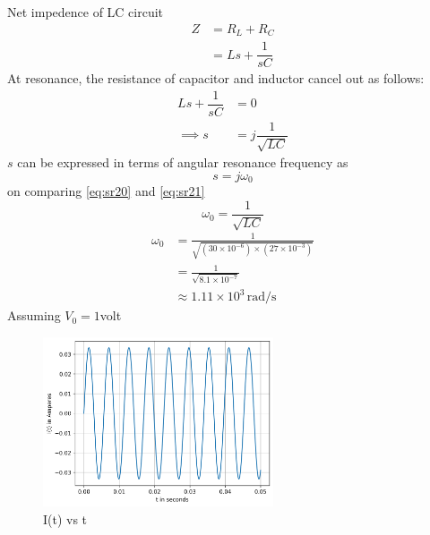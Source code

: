 \documentclass[journal,12pt,twocolumn]{IEEEtran}
\theoremstyle{remark}
\begin{document}
Net impedence of LC circuit \\
\begin{align}
Z&=R_L +R_C \\
&=Ls + \dfrac{1}{sC} 
\end{align}
At resonance, the resistance of capacitor and inductor cancel out as follows:
\begin{align}
    Ls + \dfrac{1}{sC} &= 0\\
    \implies s &= j\dfrac{1}{\sqrt{LC}} \label{eq:sr20}
\end{align}
$s$ can be expressed in terms of angular resonance frequency as
\begin{equation}
    s = j\omega_0 \label{eq:sr21}
\end{equation}
on comparing \eqref{eq:sr20} and \eqref{eq:sr21}
\begin{equation}
    \omega_0 = \dfrac{1}{\sqrt{LC}}
\end{equation}
\begin{align}
\omega_0 &= \frac{1}{\sqrt{(30 \times 10^{-6}) \times (27 \times 10^{-3})}} \\
&= \frac{1}{\sqrt{8.1 \times 10^{-7}}}\\
& \approx 1.11 \times 10^{3} \, \text{rad/s}
\end{align}
Assuming $V_0=1$volt\\
\begin{figure}[h!]
    \centering
    \includegraphics[width=\columnwidth,height=5cm]{figs/p.png}
    \caption{I(t) vs t}
    \label{fig:sr31}
\end{figure}
\end{document}
